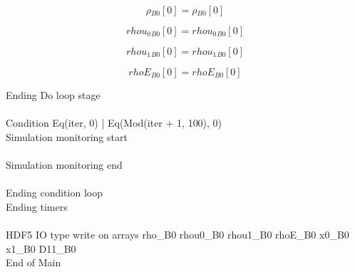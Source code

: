 \documentclass{article}
\begin{document}
\begin{dmath}{\rho{_{B0}}}[{0}] = {\rho{_{B0}}}[{0}]\end{dmath}

\begin{dmath}{rhou_{0}{_{B0}}}[{0}] = {rhou_{0}{_{B0}}}[{0}]\end{dmath}

\begin{dmath}{rhou_{1}{_{B0}}}[{0}] = {rhou_{1}{_{B0}}}[{0}]\end{dmath}

\begin{dmath}{rhoE{_{B0}}}[{0}] = {rhoE{_{B0}}}[{0}]\end{dmath}

\noindent Ending Do loop stage\\
\\\noindent Condition Eq(iter, 0) | Eq(Mod(iter + 1, 100), 0)\\\noindent Simulation monitoring start\\
\\\noindent Simulation monitoring end\\
\\\noindent Ending condition loop %
\\\noindent Ending timers\\
\\\noindent HDF5 IO type write on arrays rho_B0 rhou0_B0 rhou1_B0 rhoE_B0 x0_B0 x1_B0 D11_B0\\\noindent End of Main\\
\end{document}
